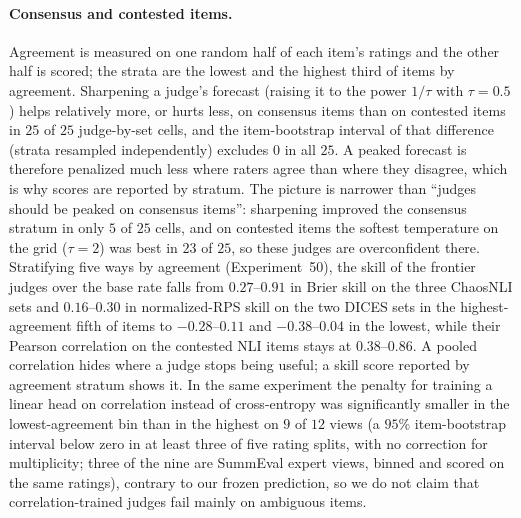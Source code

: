 \paragraph{Consensus and contested items.}
Agreement is measured on one random half of each item's ratings and the other half is scored; the strata are the lowest and the highest third of items by agreement.
Sharpening a judge's forecast (raising it to the power $1/\tau$ with $\tau=0.5$) helps relatively more, or hurts less, on consensus items than on contested items in $25$ of $25$ judge-by-set cells, and the item-bootstrap interval of that difference (strata resampled independently) excludes $0$ in all $25$.
A peaked forecast is therefore penalized much less where raters agree than where they disagree, which is why scores are reported by stratum.
The picture is narrower than ``judges should be peaked on consensus items'': sharpening improved the consensus stratum in only $5$ of $25$ cells, and on contested items the softest temperature on the grid ($\tau=2$) was best in $23$ of $25$, so these judges are overconfident there.
Stratifying five ways by agreement (Experiment~50), the skill of the frontier judges over the base rate falls from $0.27$--$0.91$ in Brier skill on the three ChaosNLI sets and $0.16$--$0.30$ in normalized-RPS skill on the two DICES sets in the highest-agreement fifth of items to $-0.28$--$0.11$ and $-0.38$--$0.04$ in the lowest, while their Pearson correlation on the contested NLI items stays at $0.38$--$0.86$.
A pooled correlation hides where a judge stops being useful; a skill score reported by agreement stratum shows it.
In the same experiment the penalty for training a linear head on correlation instead of cross-entropy was significantly smaller in the lowest-agreement bin than in the highest on $9$ of $12$ views (a $95\%$ item-bootstrap interval below zero in at least three of five rating splits, with no correction for multiplicity; three of the nine are SummEval expert views, binned and scored on the same ratings), contrary to our frozen prediction, so we do not claim that correlation-trained judges fail mainly on ambiguous items.

